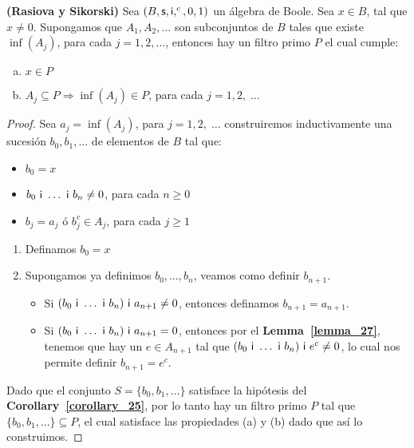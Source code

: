   \begin{theorem}
    \PN \textbf{(Rasiova y Sikorski)} Sea $(B, \mathsf{s}, \mathsf{i}, ^{c}, 0, 1)$ un álgebra de Boole. Sea $x \in B$, tal que
    $x \neq 0$. Supongamos que $A_{1}, A_{2}, \dotsc$ son subconjuntos de $B$ tales que existe $\inf(A_{j})$, para cada
    $j = 1, 2, \dotsc$, entonces hay un filtro primo $P$ el cual cumple:
    \begin{enumerate}[a)]
      \item $x \in P$
      \item $A_{j} \subseteq P \Rightarrow \inf(A_{j}) \in P$, para cada $j = 1, 2, \; \dotsc$
    \end{enumerate}
  \end{theorem}
  \begin{proof}
    \PN Sea $a_{j} = \inf(A_{j})$, para $j = 1, 2, \; \dotsc $ construiremos inductivamente una sucesión $b_{0},
    b_{1}, \dotsc$ de elementos de $B$ tal que:
    \begin{itemize}
      \item $b_{0} = x$
      \item $b_{0} \ \mathsf{i} \ \dotsc \ \mathsf{i} \ b_{n} \neq 0$, para cada $n \geq 0$
      \item $b_{j} = a_{j}$ ó $b_{j}^{c} \in A_{j}$, para cada $j \geq 1$
    \end{itemize}
    \begin{enumerate}[(1)]
      \item Definamos $b_{0} = x$
      \item Supongamos ya definimos $b_{0}, \dotsc, b_{n}$, veamos como definir $b_{n+1}$.
        \begin{itemize}
          \item Si $(b_{0} \ \mathsf{i} \ \dotsc \ \mathsf{i} \  b_{n}) \ \mathsf{i} \ a_{n+1}\neq 0$, entonces definamos $b_{n+1} = a_{n+1}$.
          \item Si $(b_{0} \ \IN \ \dotsc \ \IN \ b_{n}) \ \IN \ a_{n+1}=0$, entonces por el
            \textbf{Lemma~\ref{lemma_27}}, tenemos que hay un $e \in A_{n+1}$ tal que $(b_{0} \ \mathsf{i} \ \dotsc \ \mathsf{i} \
            b_{n}) \ \mathsf{i} \ e^{c}\neq 0$, lo cual nos permite definir $b_{n+1} = e^{c}$.
        \end{itemize}
    \end{enumerate}

    \PN Dado que el conjunto $S = \{b_{0}, b_{1}, \dotsc\}$ satisface la hipótesis del
    \textbf{Corollary~\ref{corollary_25}}, por lo tanto hay un filtro primo $P$ tal que $\{b_{0}, b_{1}, \dotsc\}
    \subseteq P$, el cual satisface las propiedades (a) y (b) dado que así lo construimos.
  \end{proof}
